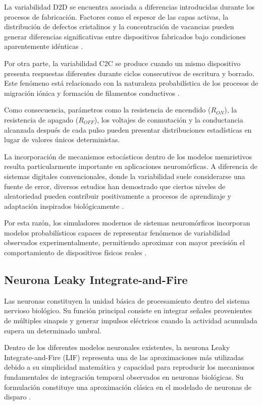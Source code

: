 La variabilidad D2D se encuentra asociada a diferencias introducidas durante los procesos de fabricación. Factores como el espesor de las capas activas, la distribución de defectos cristalinos y la concentración de vacancias pueden generar diferencias significativas entre dispositivos fabricados bajo condiciones aparentemente idénticas \cite{29}.

Por otra parte, la variabilidad C2C se produce cuando un mismo dispositivo presenta respuestas diferentes durante ciclos consecutivos de escritura y borrado. Este fenómeno está relacionado con la naturaleza probabilística de los procesos de migración iónica y formación de filamentos conductivos \cite{27}.

Como consecuencia, parámetros como la resistencia de encendido ($R_{ON}$), la resistencia de apagado ($R_{OFF}$), los voltajes de conmutación y la conductancia alcanzada después de cada pulso pueden presentar distribuciones estadísticas en lugar de valores únicos deterministas.

La incorporación de mecanismos estocásticos dentro de los modelos memristivos resulta particularmente importante en aplicaciones neuromórficas. A diferencia de sistemas digitales convencionales, donde la variabilidad suele considerarse una fuente de error, diversos estudios han demostrado que ciertos niveles de aleatoriedad pueden contribuir positivamente a procesos de aprendizaje y adaptación inspirados biológicamente \cite{8}.

Por esta razón, los simuladores modernos de sistemas neuromórficos incorporan modelos probabilísticos capaces de representar fenómenos de variabilidad observados experimentalmente, permitiendo aproximar con mayor precisión el comportamiento de dispositivos físicos reales \cite{21,27,29}.

\subsection{Neurona Leaky Integrate-and-Fire}

Las neuronas constituyen la unidad básica de procesamiento dentro del sistema nervioso biológico. Su función principal consiste en integrar señales provenientes de múltiples sinapsis y generar impulsos eléctricos cuando la actividad acumulada supera un determinado umbral.

Dentro de los diferentes modelos neuronales existentes, la neurona Leaky Integrate-and-Fire (LIF) representa una de las aproximaciones más utilizadas debido a su simplicidad matemática y capacidad para reproducir los mecanismos fundamentales de integración temporal observados en neuronas biológicas.
Su formulación constituye una aproximación clásica en el modelado de neuronas de disparo \cite{36}.

